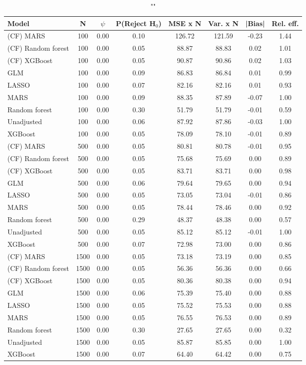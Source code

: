 
\begin{table}
\centering
\caption{""}
\begin{tabular}{lccccccc}
\toprule
Model & N & $\psi$ & P(Reject H$_0$) & MSE x N & Var. x N & |Bias| & Rel. eff.\\ \midrule
(CF) MARS & 100 & 0.00 & 0.10 & 126.72 & 121.59 & -0.23 & 1.44 \\ 
(CF) Random forest & 100 & 0.00 & 0.05 &  88.87 &  88.83 &  0.02 & 1.01 \\ 
(CF) XGBoost & 100 & 0.00 & 0.05 &  90.87 &  90.86 &  0.02 & 1.03 \\ 
GLM & 100 & 0.00 & 0.09 &  86.83 &  86.84 &  0.01 & 0.99 \\ 
LASSO & 100 & 0.00 & 0.07 &  82.16 &  82.16 &  0.01 & 0.93 \\ 
MARS & 100 & 0.00 & 0.09 &  88.35 &  87.89 & -0.07 & 1.00 \\ 
Random forest & 100 & 0.00 & 0.30 &  51.79 &  51.79 & -0.01 & 0.59 \\ 
Unadjusted & 100 & 0.00 & 0.06 &  87.92 &  87.86 & -0.03 & 1.00 \\ 
XGBoost & 100 & 0.00 & 0.05 &  78.09 &  78.10 & -0.01 & 0.89 \\ \addlinespace 
(CF) MARS & 500 & 0.00 & 0.05 &  80.81 &  80.78 & -0.01 & 0.95 \\ 
(CF) Random forest & 500 & 0.00 & 0.05 &  75.68 &  75.69 &  0.00 & 0.89 \\ 
(CF) XGBoost & 500 & 0.00 & 0.05 &  83.71 &  83.71 &  0.00 & 0.98 \\ 
GLM & 500 & 0.00 & 0.06 &  79.64 &  79.65 &  0.00 & 0.94 \\ 
LASSO & 500 & 0.00 & 0.05 &  73.05 &  73.04 & -0.01 & 0.86 \\ 
MARS & 500 & 0.00 & 0.05 &  78.44 &  78.46 &  0.00 & 0.92 \\ 
Random forest & 500 & 0.00 & 0.29 &  48.37 &  48.38 &  0.00 & 0.57 \\ 
Unadjusted & 500 & 0.00 & 0.05 &  85.12 &  85.12 & -0.01 & 1.00 \\ 
XGBoost & 500 & 0.00 & 0.07 &  72.98 &  73.00 &  0.00 & 0.86 \\ \addlinespace 
(CF) MARS & 1500 & 0.00 & 0.05 &  73.18 &  73.19 &  0.00 & 0.85 \\ 
(CF) Random forest & 1500 & 0.00 & 0.05 &  56.36 &  56.36 &  0.00 & 0.66 \\ 
(CF) XGBoost & 1500 & 0.00 & 0.05 &  80.36 &  80.38 &  0.00 & 0.94 \\ 
GLM & 1500 & 0.00 & 0.06 &  75.39 &  75.40 &  0.00 & 0.88 \\ 
LASSO & 1500 & 0.00 & 0.05 &  75.52 &  75.53 &  0.00 & 0.88 \\ 
MARS & 1500 & 0.00 & 0.05 &  76.55 &  76.53 &  0.00 & 0.89 \\ 
Random forest & 1500 & 0.00 & 0.30 &  27.65 &  27.65 &  0.00 & 0.32 \\ 
Unadjusted & 1500 & 0.00 & 0.05 &  85.87 &  85.85 &  0.00 & 1.00 \\ 
XGBoost & 1500 & 0.00 & 0.07 &  64.40 &  64.42 &  0.00 & 0.75 \\
\bottomrule
\end{tabular}
\end{table}

